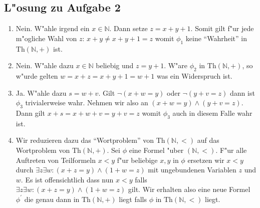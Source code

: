 \documentclass[10pt,oneside,onecolumn,a4paper,german,titlepage]{article}
\begin{document}
\subsection*{L"osung zu Aufgabe 2}
\begin{enumerate}
\item Nein. W"ahle irgend ein $x \in \mathbb{N}$. Dann setze $z = x + y + 1$. Somit gilt f"ur jede m"ogliche Wahl von $z$: $x + y \neq x + y + 1 = z$ womit $\phi_1$ keine "`Wahrheit"' in $\text{Th}(\mathbb{N},+)$ ist.
\item Nein. W"ahle dazu $x \in \mathbb{N}$ beliebig und $z = y + 1$. W"are $\phi_2$ in $\text{Th}(\mathbb{N},+)$, so w"urde gelten $w = x + z = x + y + 1 = w + 1$ was ein Widerspruch ist.
\item Ja. W"ahle dazu $s = w + v$. Gilt $\neg(x + w = y)$ oder $\neg(y + v = z)$ dann ist $\phi_3$ trivialerweise wahr. Nehmen wir also an $(x + w = y) \wedge (y + v = z)$. Dann gilt $x + s = x + w + v = y + v = z$ womit $\phi_3$ auch in diesem Falle wahr ist.
\item Wir reduzieren dazu das "`Wortproblem"' von $\text{Th}(\mathbb{N},<)$ auf das Wortproblem von $\text{Th}(\mathbb{N},+)$. Sei $\phi$ eine Formel "uber $(\mathbb{N},<)$. F"ur alle Auftreten von Teilformeln $x < y$ f"ur beliebige $x,y$ in $\phi$ ersetzen wir $x < y$ durch $\exists z \exists w: (x + z = y) \wedge (1 + w = z)$ mit ungebundenen Variablen $z$ und $w$. Es ist offensichtlich dass nun $x < y$ falls $\exists z \exists w: (x + z = y) \wedge (1 + w = z)$ gilt. Wir erhalten also eine neue Formel $\phi^\prime$ die genau dann in $\text{Th}(\mathbb{N},+)$ liegt falls $\phi$ in $\text{Th}(\mathbb{N},<)$ liegt.
\end{enumerate}
\end{document}
